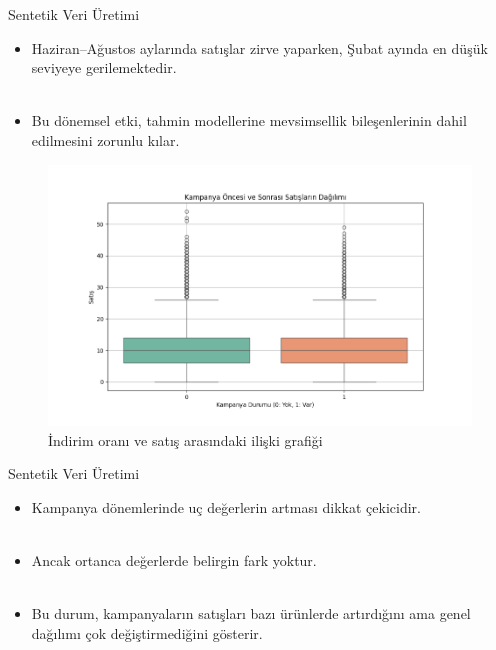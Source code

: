 \documentclass[12pt]{beamer}
\begin{document}
	\begin{frame}{Sentetik Veri Üretimi}
		\begin{itemize}
			\item Haziran–Ağustos aylarında satışlar zirve yaparken, Şubat
			ayında en düşük seviyeye gerilemektedir.
			\\~\\
			\item Bu dönemsel etki, tahmin modellerine mevsimsellik
			bileşenlerinin dahil edilmesini zorunlu kılar.
		\end{itemize}
	\end{frame}
	
	\begin{frame}
		\begin{figure}
			\centering	
			\includegraphics[width=0.65\linewidth]{figures/campaign_sales_boxplot.png}
			
			{\small \caption{İndirim oranı ve satış arasındaki ilişki grafiği}}
		\end{figure}
	\end{frame}
	
	\begin{frame}{Sentetik Veri Üretimi}
		\begin{itemize}
			\item Kampanya dönemlerinde uç değerlerin artması dikkat
			çekicidir.
			\\~\\
			\item  Ancak ortanca değerlerde belirgin fark yoktur.
			\\~\\
			\item Bu durum, kampanyaların satışları bazı ürünlerde
			artırdığını ama genel dağılımı çok değiştirmediğini gösterir.
		\end{itemize}
	\end{frame}
	
\end{document}
